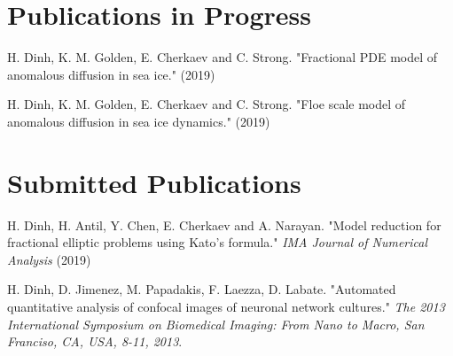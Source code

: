 \newcommand{\arxiv}[1]{[\href{http://arxiv.org/abs/#1}{arXiv:#1}]}


\setcounter{numPubs}{1}
\setcounter{pubCounter}{\value{numPubs}}

\section{\sc Publications in Progress}
\begin{etaremune}[start=\value{pubCounter}]
\item[ ]
 H. Dinh, K. M. Golden, E. Cherkaev and C. Strong. "Fractional PDE model of anomalous diffusion in sea ice." (2019)
\item[ ]
 H. Dinh, K. M. Golden, E. Cherkaev and C. Strong. "Floe scale model of anomalous diffusion in sea ice dynamics." (2019)
\end{etaremune}

\section{\sc Submitted Publications}
\begin{etaremune}[start=\value{pubCounter}]
 \item[ ]
  H. Dinh, H. Antil, Y. Chen, E. Cherkaev and A. Narayan. "Model reduction for fractional elliptic problems using Kato's formula." {\it IMA Journal of Numerical Analysis} (2019)

  \item[ ] H. Dinh, D. Jimenez, M. Papadakis, F. Laezza, D. Labate. "Automated quantitative analysis of confocal images of neuronal network cultures." {\it The 2013 International Symposium on Biomedical Imaging: From Nano to Macro, San Franciso, CA, USA, 8-11, 2013}. 
\end{etaremune}



